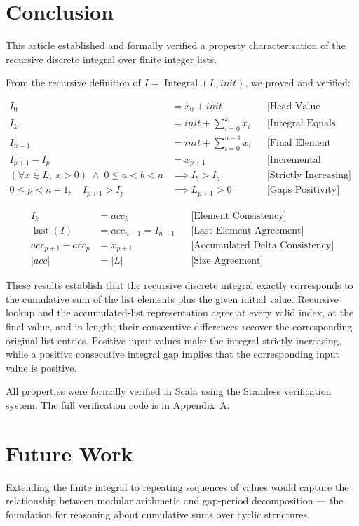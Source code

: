 \section{Conclusion}
\label{sec:conclusion}

This article established and formally verified a property
characterization of the recursive discrete integral over finite integer
lists.

From the recursive definition of $I = \operatorname{Integral}(L, init)$,
we proved and verified:

\begin{equation*}
\begin{aligned}
I_0 &= x_0 + init
  && \text{[Head Value Matches Definition]} \\
I_k &= init + \sum_{i=0}^k x_i
  && \text{[Integral Equals Sum Until Position]} \\
I_{n-1} &= init + \sum_{i=0}^{n-1} x_i
  && \text{[Final Element Equals Full Sum]} \\
I_{p+1} - I_p &= x_{p+1}
  && \text{[Incremental Change Matches List]} \\
(\forall x \in L,\ x > 0) \;\land\; 0 \leq a < b < n &\implies I_b > I_a
  && \text{[Strictly Increasing]} \\
0 \leq p < n-1,\quad I_{p+1} > I_p &\implies L_{p+1} > 0
  && \text{[Gaps Positivity]}
\end{aligned}
\end{equation*}

\begin{equation*}
\begin{aligned}
I_k &= acc_k
  && \text{[Element Consistency]} \\
\operatorname{last}(I) &= acc_{n-1} = I_{n-1}
  && \text{[Last Element Agreement]} \\
acc_{p+1} - acc_p &= x_{p+1}
  && \text{[Accumulated Delta Consistency]} \\
\lvert acc\rvert &= \lvert L\rvert
  && \text{[Size Agreement]}
\end{aligned}
\end{equation*}

These results establish that the recursive discrete integral exactly
corresponds to the cumulative sum of the list elements plus the given
initial value. Recursive lookup and the accumulated-list representation
agree at every valid index, at the final value, and in length; their
consecutive differences recover the corresponding original list entries.
Positive input values make the integral strictly increasing, while a
positive consecutive integral gap implies that the corresponding input
value is positive.

All properties were formally verified in Scala using the Stainless
verification system. The full verification code is in Appendix~A.

\section{Future Work}
\label{sec:future-work}

Extending the finite integral to repeating sequences of values would
capture the relationship between modular arithmetic and gap-period
decomposition --- the foundation for reasoning about cumulative sums over
cyclic structures.
